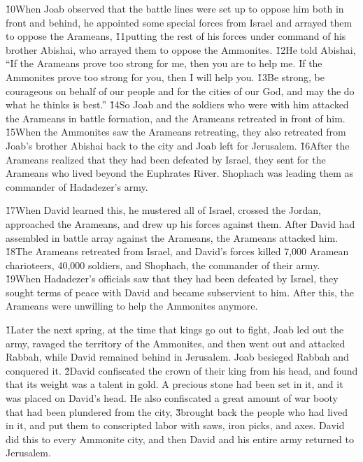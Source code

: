 \v{10}When Joab observed that the battle lines were set up to oppose him both in front and behind, he appointed some special forces from Israel and arrayed them to oppose the Arameans, \v{11}putting the rest of his forces under command of his brother Abishai, who arrayed them to oppose the Ammonites. \v{12}He told Abishai, ``If the Arameans prove too strong for me, then you are to help me. If the Ammonites prove too strong for you, then I will help you. \v{13}Be strong, be courageous on behalf of our people and for the cities of our God, and may the  do what he thinks is best.'' \v{14}So Joab and the soldiers who were with him attacked the Arameans in battle formation, and the Arameans retreated in front of him. \v{15}When the Ammonites saw the Arameans retreating, they also retreated from Joab's brother Abishai back to the city and Joab left for Jerusalem. \v{16}After the Arameans realized that they had been defeated by Israel, they sent for the Arameans who lived beyond the Euphrates River. Shophach was leading them as commander of Hadadezer's army.

\v{17}When David learned this, he mustered all of Israel, crossed the Jordan, approached the Arameans, and drew up his forces against them. After David had assembled in battle array against the Arameans, the Arameans attacked him. \v{18}The Arameans retreated from Israel, and David's forces killed 7,000 Aramean charioteers, 40,000 soldiers, and Shophach, the commander of their army. \v{19}When Hadadezer's officials saw that they had been defeated by Israel, they sought terms of peace with David and became subservient to him. After this, the Arameans were unwilling to help the Ammonites anymore.

\v{1}Later the next spring, at the time that kings go out to fight, Joab led out the army, ravaged the territory of the Ammonites, and then went out and attacked Rabbah, while David remained behind in Jerusalem. Joab besieged Rabbah and conquered it. \v{2}David confiscated the crown of their king from his head, and found that its weight was a talent in gold. A precious stone had been set in it, and it was placed on David's head. He also confiscated a great amount of war booty that had been plundered from the city, \v{3}brought back the people who had lived in it, and put them to conscripted labor with saws, iron picks, and axes. David did this to every Ammonite city, and then David and his entire army returned to Jerusalem.

